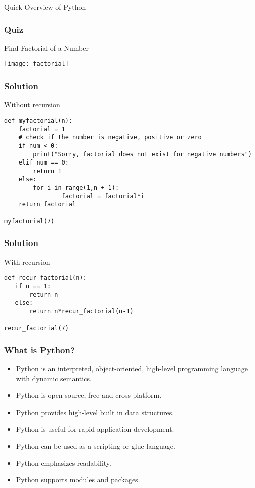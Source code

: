 \begin{frame}
  \begin{center}
    {\Large Quick Overview of Python}
  \end{center}
\end{frame}

\begin{frame}[fragile]  \frametitle{Quiz}
Find Factorial of a Number
\begin{center}
\texttt{[image: factorial]}
\end{center}
\end{frame}



\begin{frame}[fragile]  \frametitle{Solution}
Without recursion
\begin{lstlisting}
def myfactorial(n):
	factorial = 1
	# check if the number is negative, positive or zero
	if num < 0:
		print("Sorry, factorial does not exist for negative numbers")
	elif num == 0:
		return 1
	else:
		for i in range(1,n + 1):
       			factorial = factorial*i
	return factorial

myfactorial(7)
\end{lstlisting}
\end{frame}

\begin{frame}[fragile]  \frametitle{Solution}
With recursion
\begin{lstlisting}
def recur_factorial(n):
   if n == 1:
       return n
   else:
       return n*recur_factorial(n-1)

recur_factorial(7)
\end{lstlisting}
\end{frame}

\begin{frame}[fragile]  \frametitle{What is Python?}
\begin{itemize}
\item Python is an interpreted, object-oriented, high-level programming language with dynamic semantics.
\item Python is open source, free and cross-platform.
\item Python provides high-level built in data structures.
\item Python is useful for rapid application development.
\item Python can be used as a scripting or glue language.
\item Python emphasizes readability.
\item Python supports modules and packages.
\end{itemize}
\end{frame}

